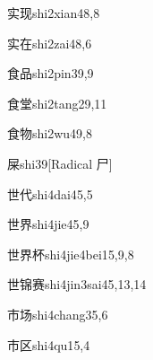 \begin{verbete}{实现}{shi2xian4}{8,8}
\end{verbete}

\begin{verbete}{实在}{shi2zai4}{8,6}
\end{verbete}

\begin{verbete}{食品}{shi2pin3}{9,9}
\end{verbete}

\begin{verbete}{食堂}{shi2tang2}{9,11}
\end{verbete}

\begin{verbete}{食物}{shi2wu4}{9,8}
\end{verbete}

\begin{verbete}{屎}{shi3}{9}[Radical 尸]
\end{verbete}

\begin{verbete}{世代}{shi4dai4}{5,5}
\end{verbete}

\begin{verbete}{世界}{shi4jie4}{5,9}
\end{verbete}

\begin{verbete}{世界杯}{shi4jie4bei1}{5,9,8}
\end{verbete}

\begin{verbete}{世锦赛}{shi4jin3sai4}{5,13,14}
\end{verbete}

\begin{verbete}{市场}{shi4chang3}{5,6}
\end{verbete}

\begin{verbete}{市区}{shi4qu1}{5,4}
\end{verbete}

